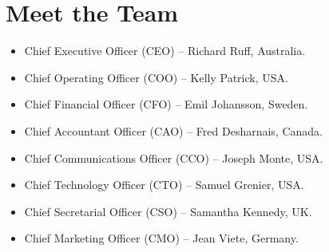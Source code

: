 \documentclass[12pt,a4paper]{article}
\begin{document}
  \section*{Meet the Team}
  \begin{itemize}
    \item{Chief Executive Officer (CEO) – Richard Ruff, Australia.}
    \item{Chief Operating Officer (COO) – Kelly Patrick, USA.}
    \item{Chief Financial Officer (CFO) – Emil Johansson, Sweden.}
    \item{Chief Accountant Officer (CAO) – Fred Desharnais, Canada.}
    \item{Chief Communications Officer (CCO) – Joseph Monte, USA.}
    \item{Chief Technology Officer (CTO) – Samuel Grenier, USA.}
    \item{Chief Secretarial Officer (CSO) – Samantha Kennedy, UK.}
    \item{Chief Marketing Officer (CMO) – Jean Viete, Germany.}
  \end{itemize}
  \printbibliography{}
\end{document}
